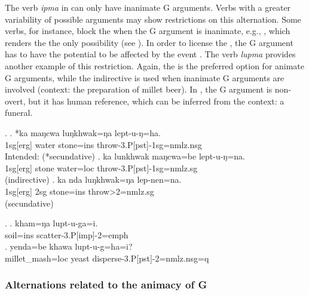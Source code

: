 The verb \emph{ipma}  in \Last can only have inanimate G arguments. Verbs with a greater variability of possible arguments may show restrictions on this alternation. Some verbs, for instance, block the  when the G argument is inanimate, e.g.,  \Next[a], which renders the  the only possibility (see \Next[b]). In order to license the , the G argument has to have the potential to be affected by the event \Next[c].  
The verb \emph{lupma}  provides another example of this restriction. Again, the  is the preferred option for animate G arguments, while the indirective is used when inanimate G arguments are involved \NNext[b] (context: the preparation of millet beer). In \NNext[a], the G argument is non-overt, but it has human reference, which can be inferred from the context: a funeral. 
\largerpage

\ex.	\ag.  *ka maŋcwa luŋkhwak=ŋa lept-u-ŋ=ha.\\
	{\sc 1sg[erg]} water stone{\sc =ins}	throw{\sc -3.P[pst]-1sg=nmlz.nsg}	\\
	Intended:    (*secundative)
	\bg.  ka lunkhwak maŋcwa=be  lept-u-ŋ=na.\\
	{\sc 1sg[erg]} stone  water{\sc =loc}  	throw{\sc -3.P[pst]-1sg=nmlz.sg}\\
   (indirective)  
 \bg. ka nda luŋkhwak=ŋa lep-nen=na.\\
 {\sc 1sg[erg]} {\sc 2sg} stone{\sc =ins}	throw{>2=nmlz.sg}	\\
  (secundative)

\ex. \ag. kham=ŋa lupt-u-ga=i.\\ 
	soil{\sc =ins} scatter{\sc -3.P[imp]-2=emph} \\
	\bg. yenda=be khawa lupt-u-g=ha=i?\\
	millet\_mash{\sc =loc} yeast disperse{\sc -3.P[pst]-2=nmlz.nsg=q}   \\
	 
 
\subsubsection{Alternations related to the animacy of G}\label{loc-alt}
 
